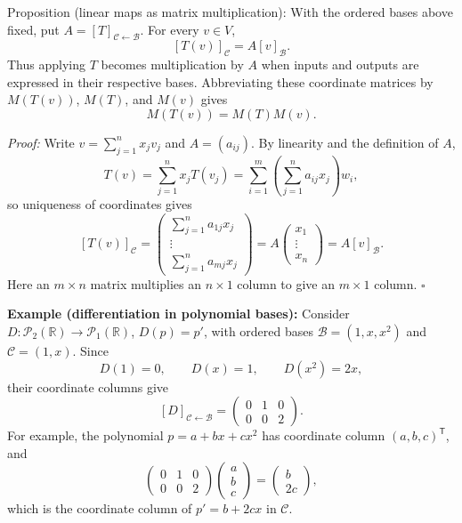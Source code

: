 \documentclass[a4paper,11pt,abstract=true]{scrartcl}
\theoremstyle{dotlessP}
\theoremstyle{dotlessS}
\theoremstyle{remark}
\theoremstyle{definition}
\begin{document}
\begin{mainbox}{Proposition (linear maps as matrix multiplication):}
With the ordered bases above fixed, put
$A={[T]}_{\mathcal{C}\leftarrow\mathcal{B}}$. For every $v\in V$,
\[
{[T(v)]}_{\mathcal{C}}
=A{[v]}_{\mathcal{B}}.
\]
Thus applying $T$ becomes multiplication by $A$ when inputs and outputs
are expressed in their respective bases. Abbreviating these coordinate
matrices by $M(T(v))$, $M(T)$, and $M(v)$ gives
\[
M(T(v))=M(T)M(v).
\]
\end{mainbox}

\begin{claim_box}
\textit{Proof:} Write $v=\sum_{j=1}^n x_j v_j$ and $A=(a_{ij})$.
By linearity and the definition of $A$,
\[
T(v)=\sum_{j=1}^n x_j T(v_j)
=\sum_{i=1}^m\left(\sum_{j=1}^n a_{ij}x_j\right)w_i,
\]
so uniqueness of coordinates gives
\[
{[T(v)]}_{\mathcal{C}}
=\begin{pmatrix}
\sum_{j=1}^n a_{1j}x_j\\
\vdots\\
\sum_{j=1}^n a_{mj}x_j
\end{pmatrix}
=A\begin{pmatrix}x_1\\\vdots\\x_n\end{pmatrix}
=A{[v]}_{\mathcal{B}}.
\]
Here an $m\times n$ matrix multiplies an $n\times1$ column to give
an $m\times1$ column. \hfill$\square$
\end{claim_box}

\begin{example_box}
\textbf{Example (differentiation in polynomial bases):} Consider
$D:\mathcal{P}_2(\mathbb{R})\longrightarrow\mathcal{P}_1(\mathbb{R})$,
$D(p)=p'$, with ordered bases
$\mathcal{B}=(1,x,x^2)$ and $\mathcal{C}=(1,x)$. Since
\[
D(1)=0,\qquad D(x)=1,\qquad D(x^2)=2x,
\]
their coordinate columns give
\[
{[D]}_{\mathcal{C}\leftarrow\mathcal{B}}
=\begin{pmatrix}0&1&0\\0&0&2\end{pmatrix}.
\]
For example, the polynomial $p=a+bx+cx^2$ has coordinate column
${(a,b,c)}^{\mathsf{T}}$, and
\[
\begin{pmatrix}0&1&0\\0&0&2\end{pmatrix}
\begin{pmatrix}a\\b\\c\end{pmatrix}
=\begin{pmatrix}b\\2c\end{pmatrix},
\]
which is the coordinate column of $p'=b+2cx$ in $\mathcal{C}$.
\end{example_box}
\end{document}
